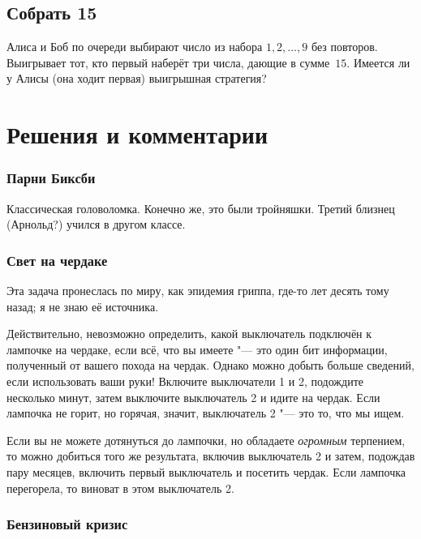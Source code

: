 \documentclass[twoside]{book}
\makeatletter
\newcommand{\rindex}[2][\imki@jobname]{%
  \index[#1]{\detokenize{#2}}%
}
\makeatother
\begin{document}
 
\subsection*{Собрать 15} %
\rindex{Собрать 15}

Алиса и Боб по очереди выбирают число из набора $1, 2,\dots,9$ без повторов.
Выигрывает тот, кто первый наберёт три числа, дающие в сумме~$15$.
Имеется ли у Алисы (она ходит первая)
выигрышная стратегия?

 

\section*{Решения и комментарии}

\subsubsection*{Парни Биксби} %

Классическая головоломка.
Конечно же, это были тройняшки.
Третий близнец (Арнольд?) учился в другом классе.

\subsubsection*{Свет на чердаке} %

Эта задача пронеслась по миру, как эпидемия гриппа, где-то лет десять тому назад;
я не знаю её источника.


Действительно, невозможно определить, какой выключатель подключён к лампочке на чердаке, если всё, что вы имеете "--- это один бит информации, полученный от вашего похода на чердак.
Однако можно добыть больше сведений, если использовать ваши руки!
Включите выключатели 1 и 2, подождите несколько минут, затем выключите выключатель 2 и идите на чердак.
Если лампочка не горит, но горячая, значит, выключатель 2 "--- это то, что мы ищем.
\heart

Если вы не можете дотянуться до лампочки, но обладаете \emph{огромным} терпением, то можно добиться того же результата, включив  выключатель 2 и затем, подождав пару месяцев, включить первый выключатель и посетить чердак.
Если лампочка перегорела, то виноват в этом выключатель 2.

\subsubsection*{Бензиновый кризис} %
\end{document}
